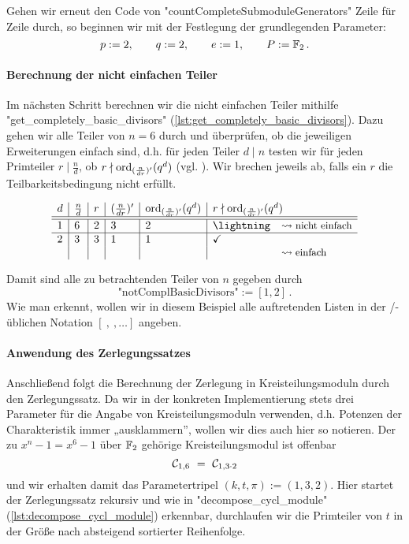 Gehen wir erneut den Code von "countCompleteSubmoduleGenerators"
Zeile für Zeile durch, so beginnen wir mit der Festlegung der grundlegenden
Parameter:
\[ p := 2,\qquad q := 2,\qquad e := 1,\qquad P := \mathbb{F}_2\,.\]


\paragraph{Berechnung der nicht einfachen Teiler} Im nächsten Schritt berechnen
wir die nicht einfachen Teiler mithilfe "get_completely_basic_divisors" 
(\autoref{lst:get_completely_basic_divisors}).
Dazu gehen wir alle Teiler von $n=6$ durch und überprüfen, ob die jeweiligen
Erweiterungen einfach sind, d.h. für jeden Teiler $d \mid n$ testen wir für
jeden Primteiler $r \mid \tfrac{n}{d}$, ob $r \nmid \operatorname{ord}_{(\frac{n}{dr})'}(q^d)$
(vgl. ). Wir brechen jeweils ab, falls ein
$r$ die Teilbarkeitsbedingung nicht erfüllt.

\[ \begin{array}{l|l|l|l|l|ll} 
  d & \frac{n}{d} & r & (\frac{n}{dr})' & \ord_{(\frac{n}{dr})'}(q^d) & 
    \multicolumn{2}{l}{r \nmid \ord_{(\frac{n}{dr})'}(q^d)}\\\hline\hline
  1 & 6 & 2 & 3 & 2 & \lightning &\leadsto\text{\small nicht einfach}\\\hline
  2 & 3 & 3 & 1 & 1 & \checkmark\\
  &&&&&& \leadsto\text{\small einfach}
  \end{array}\]

Damit sind alle zu betrachtenden Teiler von $n$ gegeben durch
\[ \text{"notComplBasicDivisors"} := [1,2]\,. \]
Wie man erkennt, wollen wir in diesem Beispiel alle auftretenden Listen in der
\python/\sage-üblichen Notation $[\ ,\ ,\ldots]$ angeben.


\paragraph{Anwendung des Zerlegungssatzes} Anschließend folgt die Berechnung
der Zerlegung in Kreisteilungsmoduln durch den Zerlegungssatz. Da wir in der
konkreten Implementierung stets drei Parameter für die Angabe von
Kreisteilungsmoduln verwenden, d.h. Potenzen der Charakteristik immer
„ausklammern”, wollen wir dies auch hier so notieren. Der zu
$x^n-1 = x^6-1$ über $\mathbb{F}_2$ gehörige Kreisteilungsmodul ist offenbar
\[ \mathcal{C}_{1,6} \ =\  \mathcal{C}_{1,3\cdot 2}\]
und wir erhalten damit das Parametertripel $(k,t,\pi) := (1,3,2)$.
Hier startet der Zerlegungssatz rekursiv und wie in "decompose_cycl_module" 
(\autoref{lst:decompose_cycl_module}) erkennbar, durchlaufen wir die Primteiler
von $t$ in der Größe nach absteigend sortierter Reihenfolge.

